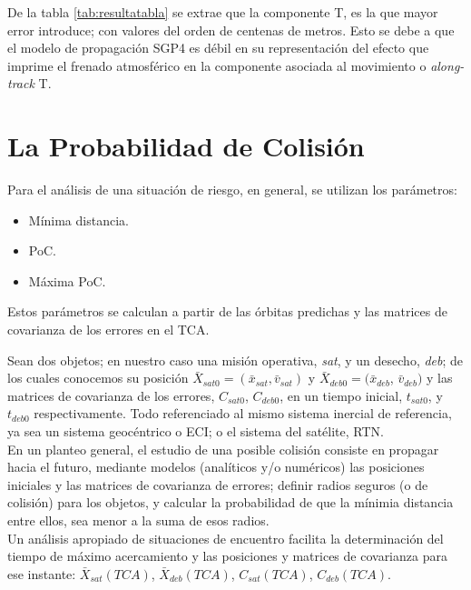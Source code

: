 {De la tabla \ref{tab:resultatabla} se extrae que la componente T, es la que mayor error introduce; con valores del orden de centenas de metros. Esto se debe a que el modelo de propagaci\'on SGP4 es d\'ebil en su representaci\'on del efecto que imprime el frenado atmosf\'erico en la componente asociada al movimiento o {\it{along-track}} T. 

\section{La Probabilidad de Colisi\'on}
Para el an\'alisis de una situaci\'on de riesgo, en general, se utilizan los par\'ametros:\\


\begin{itemize}
\centering
\itemsep0em
\item M\'inima distancia.
\item PoC.
\item M\'axima PoC.
\end{itemize}


Estos par\'ametros se calculan a partir de las \'orbitas predichas y las matrices de covarianza de los errores en el TCA.

Sean dos objetos; en nuestro caso una misi\'on operativa, {\it{sat}}, y un desecho, {\it{deb}}; de los cuales conocemos su posici\'on $\bar{X}_{sat0}=(\bar{x}_{sat},\bar{v}_{sat})$ y $\bar{X}_{deb0}=(\bar{x}_{deb}$,  $\bar{v}_{deb})$ y las matrices de covarianza de los errores, $C_{sat0}$, $C_{deb0}$, en un tiempo inicial,  $t_{sat0}$, y $t_{deb0}$ respectivamente. Todo referenciado al mismo sistema inercial de referencia, ya sea un sistema geoc\'entrico o \ac{ECI}; o el sistema del sat\'elite, \ac{RTN}.\\

En un planteo general, el estudio de una posible colisi\'on consiste en propagar hacia el futuro, mediante modelos (anal\'iticos y/o num\'ericos) las posiciones iniciales y las matrices de covarianza de errores; definir radios seguros (o de colisi\'on) para los objetos, y calcular la probabilidad de que la m\'inimia distancia entre ellos, sea menor a la suma de esos radios.\\
Un an\'alisis apropiado de situaciones de encuentro facilita la determinaci\'on del tiempo de m\'aximo acercamiento y las posiciones y matrices de covarianza para ese instante:  $\bar{X}_{sat}(TCA)$, $\bar{X}_{deb}(TCA)$, $C_{sat}(TCA)$, $C_{deb}(TCA)$.\\

}
